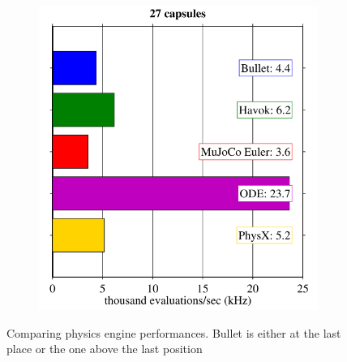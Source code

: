 \begin{figure}
\begin{subfigure}{0.33\textwidth}
      \caption{} \label{fig:1b}
    \end{subfigure}%
    \hspace*{\fill}   %
    \begin{subfigure}{0.33\textwidth}
      \includegraphics[width=\linewidth]{figures/BulletCom3.png}
      \caption{} \label{fig:1b}
    \end{subfigure}%

\caption{Comparing physics engine performances. Bullet is either at the last place or the one above the last position \cite{Erez2015} \label{fig:BulletComp}}
\end{figure}


